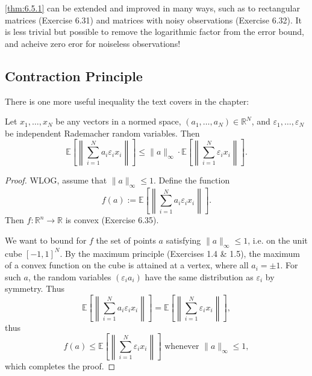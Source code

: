 \begin{remark}[Extensions]
\label{rmk:6.5.2}
\cref{thm:6.5.1} can be extended and improved in many ways, such as to rectangular matrices (Exercise 6.31) and 
matrices with noisy observations (Exercise 6.32). It is less trivial but possible to remove the logarithmic 
factor from the error bound, and acheive zero eror for noiseless observations!
\end{remark}



\subsection{Contraction Principle}
There is one more useful inequality the text covers in the chapter:

\begin{theorem}
\label{thm:6.6.1}
Let $x_1, \dots, x_N$ be any vectors in a normed space, $(a_1, \dots, a_N) \in \mathbb{R}^N$, and 
$\varepsilon_1, \dots, \varepsilon_N$ be independent Rademacher random variables. Then 
\[ \mathbb{E}\left[ \left\lVert \sum_{i = 1}^{N} a_i \varepsilon_i x_i \right\rVert \right] 
\leq \lVert a \rVert_{\infty} \cdot \mathbb{E}\left[ \left\lVert 
\sum_{i = 1}^{N} \varepsilon_i x_i \right\rVert \right]. \]
\end{theorem}

\begin{proof}
WLOG, assume that $\lVert a \rVert_{\infty} \leq 1$. Define the function 
\[ f(a) := \mathbb{E}\left[ \left\lVert \sum_{i = 1}^{N} a_i \varepsilon_i x_i \right\rVert \right]. \]
Then $f: \mathbb{R}^n \to \mathbb{R}$ is convex (Exercise 6.35).

We want to bound for $f$ the set of points $a$ satisfying $\lVert a \rVert_{\infty} \leq 1$, i.e. on the unit 
cube $[-1, 1]^N$. By the maximum principle (Exercises 1.4 \& 1.5), the maximum of a convex function on the 
cube is attained at a vertex, where all $a_i = \pm 1$. For such $a$, the random variables $(\varepsilon_i a_i)$ 
have the same distribution as $\varepsilon_i$ by symmetry. Thus 
\[ \mathbb{E}\left[ \left\lVert \sum_{i = 1}^{N} a_i \varepsilon_i x_i \right\rVert \right] 
= \mathbb{E}\left[ \left\lVert \sum_{i = 1}^{N} \varepsilon_i x_i \right\rVert \right], \]
thus 
\[ f(a) \leq \mathbb{E}\left[ \left\lVert \sum_{i = 1}^{N} \varepsilon_i x_i \right\rVert \right] 
\text{ whenever } \lVert a \rVert_{\infty} \leq 1, \]
which completes the proof.
\end{proof}

